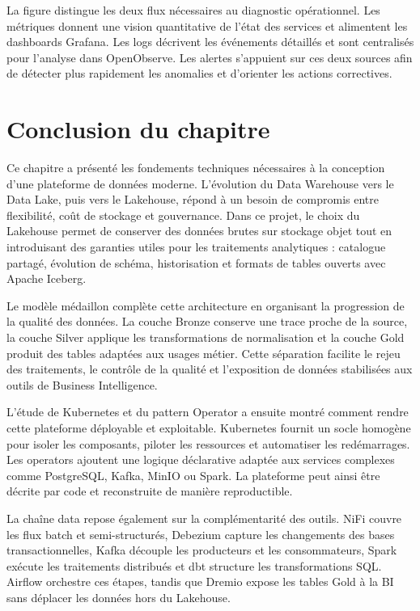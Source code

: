 La figure distingue les deux flux nécessaires au diagnostic opérationnel. Les métriques donnent une vision quantitative de l'état des services et alimentent les dashboards Grafana. Les logs décrivent les événements détaillés et sont centralisés pour l'analyse dans OpenObserve. Les alertes s'appuient sur ces deux sources afin de détecter plus rapidement les anomalies et d'orienter les actions correctives.

\section*{Conclusion du chapitre}

Ce chapitre a présenté les fondements techniques nécessaires à la conception d'une plateforme de données moderne. L'évolution du Data Warehouse vers le Data Lake, puis vers le Lakehouse, répond à un besoin de compromis entre flexibilité, coût de stockage et gouvernance. Dans ce projet, le choix du Lakehouse permet de conserver des données brutes sur stockage objet tout en introduisant des garanties utiles pour les traitements analytiques : catalogue partagé, évolution de schéma, historisation et formats de tables ouverts avec Apache Iceberg.

Le modèle médaillon complète cette architecture en organisant la progression de la qualité des données. La couche Bronze conserve une trace proche de la source, la couche Silver applique les transformations de normalisation et la couche Gold produit des tables adaptées aux usages métier. Cette séparation facilite le rejeu des traitements, le contrôle de la qualité et l'exposition de données stabilisées aux outils de Business Intelligence.

L'étude de Kubernetes et du pattern Operator a ensuite montré comment rendre cette plateforme déployable et exploitable. Kubernetes fournit un socle homogène pour isoler les composants, piloter les ressources et automatiser les redémarrages. Les operators ajoutent une logique déclarative adaptée aux services complexes comme PostgreSQL, Kafka, MinIO ou Spark. La plateforme peut ainsi être décrite par code et reconstruite de manière reproductible.

La chaîne data repose également sur la complémentarité des outils. NiFi couvre les flux batch et semi-structurés, Debezium capture les changements des bases transactionnelles, Kafka découple les producteurs et les consommateurs, Spark exécute les traitements distribués et dbt structure les transformations SQL. Airflow orchestre ces étapes, tandis que Dremio expose les tables Gold à la BI sans déplacer les données hors du Lakehouse.

